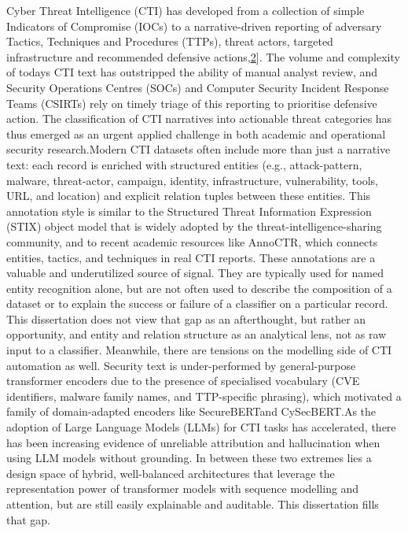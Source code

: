 \documentclass[12pt,a4paper]{report}
\begin{document}
Cyber Threat Intelligence (CTI) has developed from a collection of
simple Indicators of Compromise (IOCs) to a narrative-driven reporting
of adversary Tactics, Techniques and Procedures (TTPs), threat actors,
targeted infrastructure and recommended defensive
actions\cite{husari2017ttpdrill},\hyperref[ref_2]{\ul{2}}{]}. The
volume and complexity of today\textquotesingle s CTI text has
outstripped the ability of manual analyst review, and Security
Operations Centres (SOCs) and Computer Security Incident Response Teams
(CSIRTs) rely on timely triage of this reporting to prioritise defensive
action. The classification of CTI narratives into actionable threat
categories has thus emerged as an urgent applied challenge in both
academic and operational security research.Modern CTI datasets often
include more than just a narrative text: each record is enriched with
structured entities (e.g., attack-pattern, malware, threat-actor,
campaign, identity, infrastructure, vulnerability, tools, URL, and
location) and explicit relation tuples between these entities. This
annotation style is similar to the Structured Threat Information
Expression (STIX) object model that is widely adopted by the
threat-intelligence-sharing community, and to recent academic resources
like AnnoCTR, which connects entities, tactics, and techniques in real
CTI reports. These annotations are a valuable and underutilized source
of signal. They are typically used for named entity recognition alone,
but are not often used to describe the composition of a dataset or to
explain the success or failure of a classifier on a particular record.
This dissertation does not view that gap as an afterthought, but rather
an opportunity, and entity and relation structure as an analytical lens,
not as raw input to a classifier. Meanwhile, there are tensions on the
modelling side of CTI automation as well. Security text is
under-performed by general-purpose transformer encoders due to the
presence of specialised vocabulary (CVE identifiers, malware family
names, and TTP-specific phrasing), which motivated a family of
domain-adapted encoders like SecureBERT\cite{securebert2022}and
CySecBERT\cite{cysecbert2022}.As the adoption of Large
Language Models (LLMs) for CTI tasks has accelerated, there has been
increasing evidence of unreliable attribution and hallucination when
using LLM models without grounding\cite{ctibench2024}. In
between these two extremes lies a design space of hybrid, well-balanced
architectures that leverage the representation power of transformer
models with sequence modelling and attention, but are still easily
explainable and auditable. This dissertation fills that gap.
\end{document}
